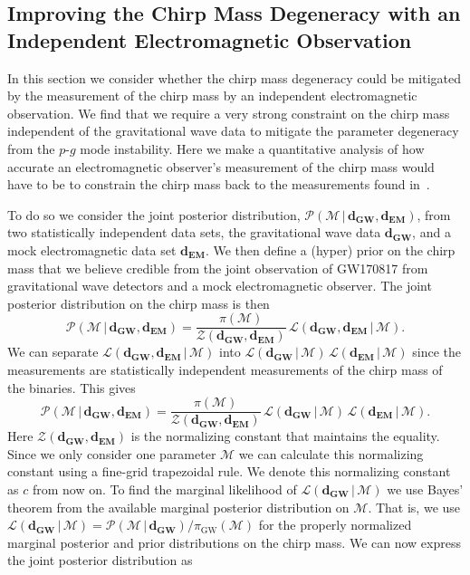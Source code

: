 \subsection{Improving the Chirp Mass Degeneracy with an Independent Electromagnetic Observation}
In this section we consider whether the chirp mass degeneracy could be mitigated by the measurement of the chirp mass by an independent electromagnetic observation. We find that we require a very strong constraint on the chirp mass independent of the gravitational wave data to mitigate the parameter degeneracy from the $p$-$g$ mode instability. Here we make a quantitative analysis of how accurate an electromagnetic observer's measurement of the chirp mass would have to be to constrain the chirp mass back to the measurements found in~\cite{de2018tidal}.

To do so we consider the joint posterior distribution, $\mathcal{P}(\mathcal{M} \, | \,  \mathbf{d_{GW}}, \mathbf{d_{EM}})$, from two statistically independent data sets, the gravitational wave data $\mathbf{d_{GW}}$, and a mock electromagnetic data set $\mathbf{d_{EM}}$. We then define a (hyper) prior on the chirp mass that we believe credible from the joint observation of GW170817 from gravitational wave detectors and a mock electromagnetic observer. The joint posterior distribution on the chirp mass is then
\begin{equation}
    \mathcal{P}(\mathcal{M} \, | \,  \mathbf{d_{GW}}, \mathbf{d_{EM}}) = \frac{\pi(\mathcal{M})}{\mathcal{Z}(\mathbf{d_{GW}}, \mathbf{d_{EM}})}  \,  \mathcal{L}(\mathbf{d_{GW}}, \mathbf{d_{EM}} \, | \, \mathcal{M}).
\end{equation}
We can separate  $\mathcal{L}(\mathbf{d_{GW}}, \mathbf{d_{EM}} \, | \, \mathcal{M})$ into  $\mathcal{L}(\mathbf{d_{GW}} \, | \, \mathcal{M}) \, \mathcal{L}(\mathbf{d_{EM}} \, | \, \mathcal{M})$ since the measurements are statistically independent measurements of the chirp mass of the binaries. This gives 
\begin{equation}
 \mathcal{P}(\mathcal{M} \, | \,  \mathbf{d_{GW}}, \mathbf{d_{EM}}) = \frac{\pi(\mathcal{M})}{\mathcal{Z}(\mathbf{d_{GW}}, \mathbf{d_{EM}})} \, \mathcal{L}(\mathbf{d_{GW}} \, | \, \mathcal{M}) \, \mathcal{L}(\mathbf{d_{EM}} \, | \, \mathcal{M}).
\end{equation}
Here $\mathcal{Z}(\mathbf{d_{GW}}, \mathbf{d_{EM}})$ is the normalizing constant that maintains the equality. Since we only consider one parameter $\mathcal{M}$ we can calculate this normalizing constant using a fine-grid trapezoidal rule. We denote this normalizing constant as $c$ from now on. To find the marginal likelihood of $\mathcal{L}(\mathbf{d_{GW}} \, | \, \mathcal{M})$ we use Bayes' theorem from the available marginal posterior distribution on $\mathcal{M}$. That is, we use $\mathcal{L}(\mathbf{d_{GW}} \, | \, \mathcal{M}) = \mathcal{P}(\mathcal{M} \, | \, \mathbf{d_{GW}}) / \pi_{\mathrm{GW}} (\mathcal{M})$ for the properly normalized marginal posterior and prior distributions on the chirp mass. We can now express the joint posterior distribution as
